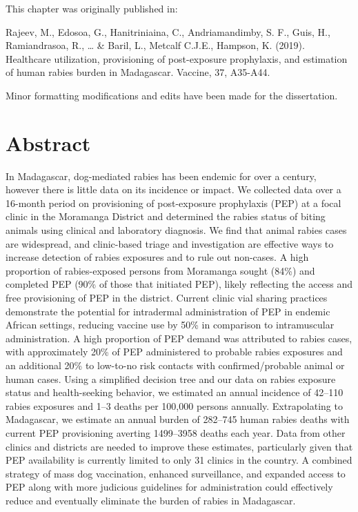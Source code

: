 \documentclass[
]{book}
\begin{document}
This chapter was originally published in:

Rajeev, M., Edosoa, G., Hanitriniaina, C., Andriamandimby, S. F., Guis, H., Ramiandrasoa, R., \ldots{} \& Baril, L., Metcalf C.J.E., Hampson, K. (2019). Healthcare utilization, provisioning of post-exposure prophylaxis, and estimation of human rabies burden in Madagascar. Vaccine, 37, A35-A44.

Minor formatting modifications and edits have been made for the dissertation.

\hypertarget{abstract}{%
\section*{Abstract}\label{abstract}}

In Madagascar, dog-mediated rabies has been endemic for over a century, however there is little data on its incidence or impact. We collected data over a 16-month period on provisioning of post-exposure prophylaxis (PEP) at a focal clinic in the Moramanga District and determined the rabies status of biting animals using clinical and laboratory diagnosis. We find that animal rabies cases are widespread, and clinic-based triage and investigation are effective ways to increase detection of rabies exposures and to rule out non-cases. A high proportion of rabies-exposed persons from Moramanga sought (84\%) and completed PEP (90\% of those that initiated PEP), likely reflecting the access and free provisioning of PEP in the district. Current clinic vial sharing practices demonstrate the potential for intradermal administration of PEP in endemic African settings, reducing vaccine use by 50\% in comparison to intramuscular administration. A high proportion of PEP demand was attributed to rabies cases, with approximately 20\% of PEP administered to probable rabies exposures and an additional 20\% to low-to-no risk contacts with confirmed/probable animal or human cases. Using a simplified decision tree and our data on rabies exposure status and health-seeking behavior, we estimated an annual incidence of 42--110 rabies exposures and 1--3 deaths per 100,000 persons annually. Extrapolating to Madagascar, we estimate an annual burden of 282--745 human rabies deaths with current PEP provisioning averting 1499--3958 deaths each year. Data from other clinics and districts are needed to improve these estimates, particularly given that PEP availability is currently limited to only 31 clinics in the country. A combined strategy of mass dog vaccination, enhanced surveillance, and expanded access to PEP along with more judicious guidelines for administration could effectively reduce and eventually eliminate the burden of rabies in Madagascar.
\end{document}
